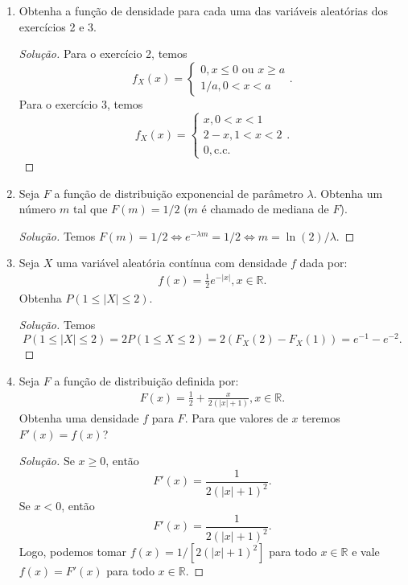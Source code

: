 \documentclass[../Notas.tex]{subfiles}
\begin{document}
\begin{enumerate}
    \item Obtenha a função de densidade para cada uma das variáveis aleatórias dos exercícios 2 e 3.
    \begin{proof}[Solução]
        Para o exercício 2, temos
        \[
        f_X(x) = \begin{cases}
        0, x\leq 0 \text{ ou } x\geq a \\
        1/a, 0<x<a
        \end{cases}.
        \]
        Para o exercício 3, temos
        \[
        f_X(x) = \begin{cases}
        x, 0<x<1 \\
        2-x, 1 < x < 2 \\
        0, \text{c.c.}
        \end{cases}.
        \]
    \end{proof}
    \item Seja $F$ a função de distribuição exponencial de parâmetro $\lambda$. Obtenha um número $m$ tal que $F(m) = 1/2$ ($m$ é chamado de mediana de $F$).
    \begin{proof}[Solução]
        Temos $F(m) = 1/2 \iff e^{-\lambda m} = 1/2 \iff m = \ln(2)/\lambda$.
    \end{proof}
    \item Seja $X$ uma variável aleatória contínua com densidade $f$ dada por:
    \begin{align*}
        f(x) = \frac{1}{2}e^{-|x|}, x\in\mathbb{R}.
    \end{align*}
    Obtenha $P(1 \leq |X| \leq 2)$.
    \begin{proof}[Solução]
        Temos
        \[
        P(1 \leq |X| \leq 2) = 2P(1\leq X\leq 2) = 2(F_X(2) - F_X(1)) = e^{-1} - e^{-2}.
        \]
    \end{proof}
    \item Seja $F$ a função de distribuição definida por:
    \begin{align*}
        F(x) = \frac{1}{2} + \frac{x}{2(|x| + 1)}, x\in\mathbb{R}.
    \end{align*}
    Obtenha uma densidade $f$ para $F$. Para que valores de $x$ teremos $F'(x) = f(x)$?
    \begin{proof}[Solução]
        Se $x\geq 0$, então
        \[
        F'(x) = \frac{1}{2(|x|+1)^2}.
        \]
        Se $x<0$, então
        \[
        F'(x) = \frac{1}{2(|x| + 1)^2}.
        \]
        Logo, podemos tomar $f(x) = 1/[2(|x|+1)^2]$ para todo $x\in\mathbb{R}$ e vale $f(x) = F'(x)$
        para todo $x\in\mathbb{R}$.
    \end{proof}
\end{enumerate}
\end{document}
